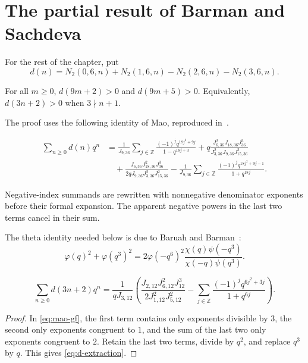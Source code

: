 \section{The partial result of Barman and Sachdeva}
For the rest of the chapter, put
\begin{equation}\label{eq:d-definition}
 d(n)=N_2(0,6,n)+N_2(1,6,n)-N_2(2,6,n)-N_2(3,6,n).
\end{equation}
\begin{theorem}\label{thm:partial}
For all $m\ge0$, $d(9m+2)>0$ and $d(9m+5)>0$.
Equivalently, $d(3n+2)>0$ when $3\nmid n+1$.
\end{theorem}
The proof uses the following identity of Mao, reproduced in~\cite{barman}.
\begin{theorem}[Mao]\label{thm:mao-gf}
\begin{equation}\label{eq:mao-gf}
\begin{split}
 \sum_{n\ge0}d(n)q^n
 &=\frac1{J_{9,36}}\sum_{j\in\mathbb Z}
       \frac{(-1)^jq^{18j^2+9j}}{1-q^{18j+3}}
   +q\frac{J_{6,36}^2J_{18,36}J_{36}^3}
            {J_{3,36}^2J_{9,36}J_{15,36}^2}\\
 &\quad+\frac{J_{6,36}J_{18,36}^2J_{36}^3}
                  {2qJ_{9,36}J_{3,36}^2J_{15,36}^2}
   -\frac1{J_{9,36}}\sum_{j\in\mathbb Z}
       \frac{(-1)^jq^{18j^2+9j-1}}{1+q^{18j}}.
\end{split}
\end{equation}
\end{theorem}
Negative-index summands are rewritten with nonnegative denominator
exponents before their formal expansion. The apparent negative powers
in the last two terms cancel in their sum.

The theta identity needed below is due to Baruah and Barman~\cite{atkin2}:
\begin{equation}\label{eq:theta-identity}
 \varphi(q)^2+\varphi(q^3)^2
 =2\varphi(-q^6)^2
   \frac{\chi(q)\psi(-q^3)}{\chi(-q)\psi(q^3)}.
\end{equation}

\begin{proposition}\label{prop:extraction}
\begin{equation}\label{eq:d-extraction}
 \sum_{n\ge0}d(3n+2)q^n
 =\frac1{qJ_{3,12}}\left(
 \frac{J_{2,12}J_{6,12}^2J_{12}^3}{2J_{1,12}^2J_{5,12}^2}
 -\sum_{j\in\mathbb Z}\frac{(-1)^jq^{6j^2+3j}}{1+q^{6j}}
 \right).
\end{equation}
\end{proposition}
\begin{proof}
In \eqref{eq:mao-gf}, the first term contains only exponents divisible by
$3$, the second only exponents congruent to $1$, and the sum of the last
two only exponents congruent to $2$. Retain the last two terms, divide by
$q^2$, and replace $q^3$ by $q$. This gives \eqref{eq:d-extraction}.
\end{proof}

